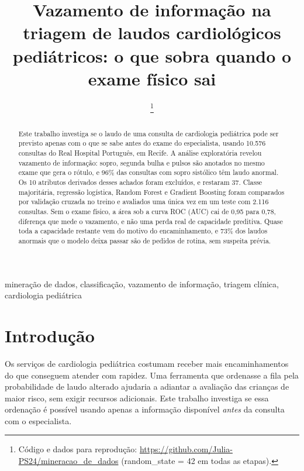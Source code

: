 \documentclass[conference]{IEEEtran}
\begin{document}
\title{Vazamento de informação na triagem de laudos cardiológicos pediátricos: o que sobra quando o exame físico sai}
\author{
\thanks{Código e dados para reprodução: \protect\url{https://github.com/Julia-PS24/mineracao_de_dados} (random\_state = 42 em todas as etapas).}}
\maketitle

\begin{abstract}
Este trabalho investiga se o laudo de uma consulta de cardiologia pediátrica pode ser previsto apenas com o que se sabe antes do exame do especialista, usando 10.576 consultas do Real Hospital Português, em Recife. A análise exploratória revelou vazamento de informação: sopro, segunda bulha e pulsos são anotados no mesmo exame que gera o rótulo, e 96\% das consultas com sopro sistólico têm laudo anormal. Os 10 atributos derivados desses achados foram excluídos, e restaram 37. Classe majoritária, regressão logística, Random Forest e Gradient Boosting foram comparados por validação cruzada no treino e avaliados uma única vez em um teste com 2.116 consultas. Sem o exame físico, a área sob a curva ROC (AUC) cai de 0,95 para 0,78, diferença que mede o vazamento, e não uma perda real de capacidade preditiva. Quase toda a capacidade restante vem do motivo do encaminhamento, e 73\% dos laudos anormais que o modelo deixa passar são de pedidos de rotina, sem suspeita prévia.
\end{abstract}

\begin{IEEEkeywords}
mineração de dados, classificação, vazamento de informação, triagem clínica, cardiologia pediátrica
\end{IEEEkeywords}

\section{Introdução}
Os serviços de cardiologia pediátrica costumam receber mais encaminhamentos do que conseguem atender com rapidez. Uma ferramenta que ordenasse a fila pela probabilidade de laudo alterado ajudaria a adiantar a avaliação das crianças de maior risco, sem exigir recursos adicionais. Este trabalho investiga se essa ordenação é possível usando apenas a informação disponível \textit{antes} da consulta com o especialista.
\end{document}
